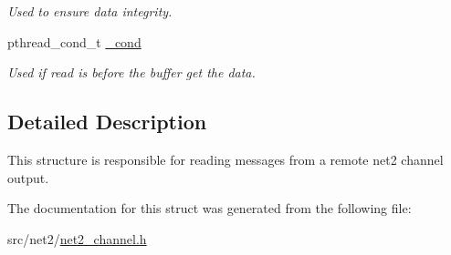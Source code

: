 \begin{DoxyCompactItemize}
\begin{DoxyCompactList}\small\item\em Used to ensure data integrity. \end{DoxyCompactList}\item 
\hypertarget{structnet2__channel__input__t_a1cd9ede6cdabb64e0381fa2eea57f71d}{}pthread\+\_\+cond\+\_\+t \hyperlink{structnet2__channel__input__t_a1cd9ede6cdabb64e0381fa2eea57f71d}{\+\_\+cond}\label{structnet2__channel__input__t_a1cd9ede6cdabb64e0381fa2eea57f71d}

\begin{DoxyCompactList}\small\item\em Used if read is before the buffer get the data. \end{DoxyCompactList}\end{DoxyCompactItemize}


\subsection{Detailed Description}
This structure is responsible for reading messages from a remote net2 channel output. 

The documentation for this struct was generated from the following file\+:\begin{DoxyCompactItemize}
\item 
src/net2/\hyperlink{net2__channel_8h}{net2\+\_\+channel.\+h}\end{DoxyCompactItemize}
